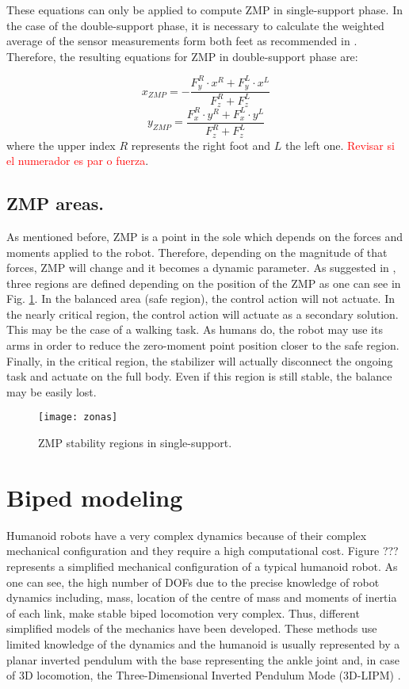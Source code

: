 These equations can only be applied to compute ZMP in single-support phase. In the case of the double-support phase, it is necessary to calculate the weighted average of the sensor measurements form both feet as recommended in \cite{Kaj_2005}. Therefore, the resulting equations for ZMP in double-support phase are:

\begin{equation}
x_{ZMP} = -\frac{F_{y}^{R}\cdot x^{R}+F_{y}^{L}\cdot x^{L}}{F_{z}^{R}+F_{z}^{L}}
\end{equation}
\begin{equation}
y_{ZMP} = \frac{F_{x}^{R}\cdot y^{R}+F_{x}^{L}\cdot y^{L}}{F_{z}^{R}+F_{z}^{L}}
\end{equation}
where the upper index $R$ represents the right foot and $L$ the left one.
\textcolor{red}{Revisar si el numerador es par o fuerza}.

\subsection{ZMP areas.}
As mentioned before, ZMP is a point in the sole which depends on the forces and moments applied to the robot. Therefore, depending on the magnitude of that forces, ZMP will change and it becomes a dynamic parameter. As suggested in \cite{Vuk}, three regions are defined depending on the position of the ZMP as one can see in Fig. \ref{fig:zonas}.
In the balanced area (safe region), the control action will not actuate. In the nearly critical region, the control action will actuate as a secondary solution. This may be the case of a walking task. As humans do, the robot may use its arms in order to reduce the zero-moment point position closer to the safe region. Finally, in the critical region, the stabilizer will actually disconnect the ongoing task and actuate on the full body. Even if this region is still stable, the balance may be easily lost. 


\begin{figure} [!hbt]
\centering
\texttt{[image: zonas]}
\caption{ZMP stability regions in single-support.}
\label{fig:zonas}
\end{figure}



\section{Biped modeling}
Humanoid robots have a very complex dynamics because of their complex mechanical configuration and they require a high computational cost. Figure ??? represents a simplified mechanical configuration of a typical humanoid robot. As one can see, the high number of DOFs due to the precise knowledge of robot dynamics including, mass, location of the centre of mass and moments of inertia of each link, make stable biped locomotion very complex. Thus, different simplified models of the mechanics have been developed. These methods use limited knowledge of the dynamics and the humanoid is usually represented by a planar inverted pendulum with the base representing the ankle joint and, in case of 3D locomotion, the Three-Dimensional Inverted Pendulum Mode (3D-LIPM) \citep{Kaj_2001}.
